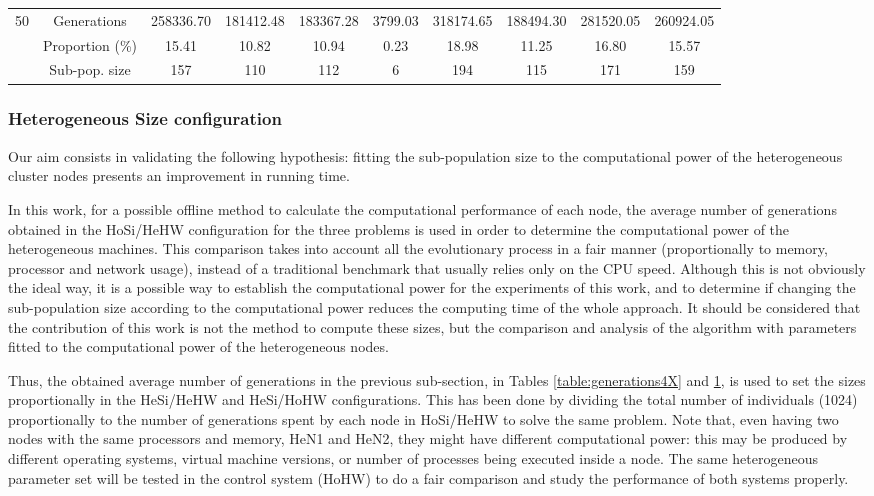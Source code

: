 \documentclass[final,1p,times]{elsarticle}
\begin{document}
\begin{table}
{{\begin{tabular}{|c|c|c|c|c|c|c|c|c|c|}
\multirow{3}{*}{50} & Generations    &  258336.70  &   181412.48   &  183367.28   &  3799.03  & 318174.65   &  188494.30  &   281520.05  &   260924.05         \\ \cline{2-10}
                     & Proportion (\%)   &  15.41   &  10.82  &   10.94  &   0.23   &   18.98  &   11.25  &   16.80   &  15.57  \\ \cline{2-10}
                     & Sub-pop. size &  157 &  110 &  112 &  6   &  194 &  115  & 171  & 159        \\ \hline  
\end{tabular}
}
\label{table:generations8X}
}
\end{table}


\subsubsection{Heterogeneous Size configuration}

Our aim consists in validating the following hypothesis: fitting the
sub-population size to the computational power of the heterogeneous
cluster nodes presents an improvement in running time.  

In this work, for a possible offline method to calculate the
computational performance of each node, the average number of
generations obtained in the HoSi/HeHW configuration for the three
problems is used in order to determine the computational power of the
heterogeneous machines. This comparison takes into account all the
evolutionary process in a fair manner (proportionally to memory,
processor and network usage), instead of a traditional benchmark that
usually relies only on the CPU speed. Although this is not obviously
the ideal way, it is a possible way to establish the computational
power for the experiments of this work, and to determine if changing
the sub-population size according to the computational power reduces
the computing time of the whole approach. It should be considered that
the contribution of this work is not the method to compute these
sizes, but the comparison and analysis of the algorithm with
parameters fitted to the computational power of the heterogeneous nodes. 




Thus, the obtained average number of generations in the previous
sub-section, in Tables \ref{table:generations4X} and
\ref{table:generations8X}, is used to set  the sizes proportionally in
the HeSi/HeHW and HeSi/HoHW configurations. This has been done by
dividing the total number of individuals (1024) proportionally to the
number of generations spent by each node in HoSi/HeHW to solve the
same problem. Note that, even having two nodes with the same
processors and memory, HeN1 and HeN2, they might have different
computational power: this may be produced by different operating
systems, virtual machine versions, or number of processes being
executed inside a node. The same heterogeneous parameter set 
will be tested in the control system (HoHW) to do a fair comparison 
and  study the performance of both systems properly.
\end{document}
